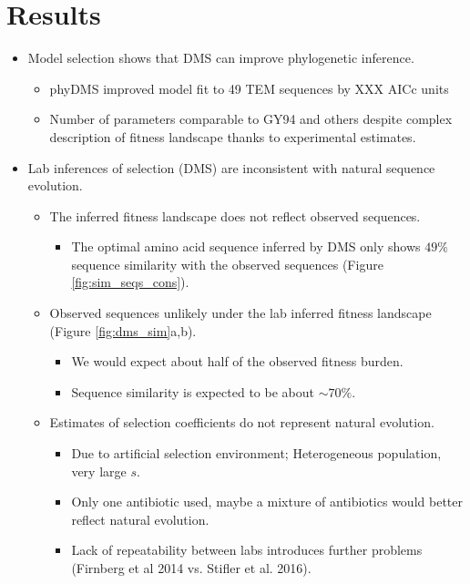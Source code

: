 \documentclass[12pt]{article}
\begin{document}
\section*{Results}

\begin{itemize}
	\item Model selection shows that DMS can improve phylogenetic inference.
	\begin{itemize}
		\item phyDMS improved model fit to 49 TEM sequences by XXX AICc units
		\item Number of parameters comparable to GY94 and others despite complex description of fitness landscape thanks to experimental estimates.
	\end{itemize}
  
	\item Lab inferences of selection (DMS) are inconsistent with natural sequence evolution.
	\begin{itemize}
 		\item The inferred fitness landscape does not reflect observed sequences.
		\begin{itemize}
			\item The optimal amino acid sequence inferred by DMS only shows $49 \%$ sequence similarity with the observed sequences (Figure \ref{fig:sim_seqs_cons}).
		\end{itemize}
		\item Observed sequences unlikely under the lab inferred fitness landscape (Figure \ref{fig:dms_sim}a,b).
		\begin{itemize}
			\item We would expect about half of the observed fitness burden.
			\item Sequence similarity is expected to be about $\sim 70 \%$.
		\end{itemize}
		\item Estimates of selection coefficients do not represent natural evolution.
 		\begin{itemize}
			\item Due to artificial selection environment; Heterogeneous population, very large $s$. 
			\item Only one antibiotic used, maybe a mixture of antibiotics would better reflect natural evolution.
			\item Lack of repeatability between labs introduces further problems (Firnberg et al 2014 vs. Stifler et al. 2016).
		\end{itemize}
	\end{itemize}
 

\end{itemize}
\end{document}
